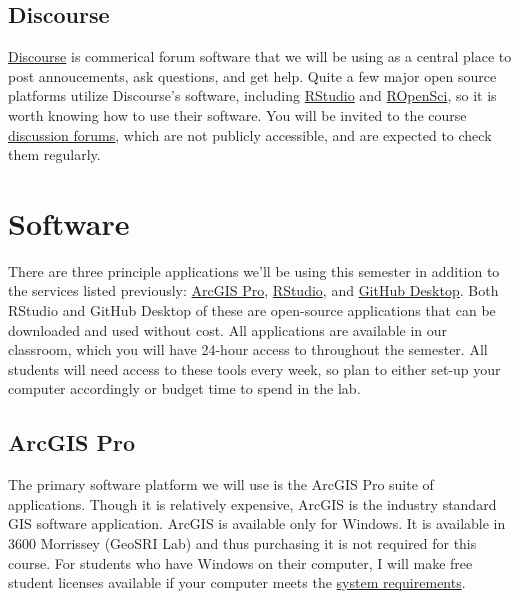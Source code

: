 \documentclass[]{book}
\begin{document}
\hypertarget{discourse}{%
\subsection{Discourse}\label{discourse}}

\href{http://discourse.org}{Discourse} is commerical forum software that we will be using as a central place to post annoucements, ask questions, and get help. Quite a few major open source platforms utilize Discourse's software, including \href{http://community.rstudio.com}{RStudio} and \href{http://discuss.ropensci.org}{ROpenSci}, so it is worth knowing how to use their software. You will be invited to the course \href{https://discuss.slu-ssds.org}{discussion forums}, which are not publicly accessible, and are expected to check them regularly.

\hypertarget{software}{%
\section{Software}\label{software}}

There are three principle applications we'll be using this semester in addition to the services listed previously: \href{https://pro.arcgis.com/en/pro-app/}{ArcGIS Pro}, \href{https://www.rstudio.com}{RStudio}, and \href{https://desktop.github.com}{GitHub Desktop}. Both RStudio and GitHub Desktop of these are open-source applications that can be downloaded and used without cost. All applications are available in our classroom, which you will have 24-hour access to throughout the semester. All students will need access to these tools every week, so plan to either set-up your computer accordingly or budget time to spend in the lab.

\hypertarget{arcgis-pro}{%
\subsection{ArcGIS Pro}\label{arcgis-pro}}

The primary software platform we will use is the ArcGIS Pro suite of applications. Though it is relatively expensive, ArcGIS is the industry standard GIS software application. ArcGIS is available only for Windows. It is available in 3600 Morrissey (GeoSRI Lab) and thus purchasing it is not required for this course. For students who have Windows on their computer, I will make free student licenses available if your computer meets the \href{http://pro.arcgis.com/en/pro-app/get-started/arcgis-pro-system-requirements.htm}{system requirements}.
\end{document}
